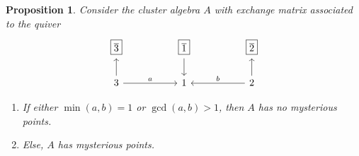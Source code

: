 \documentclass{amsart}
\numberwithin{equation}{section}
\newtheorem{proposition}[theorem]{Proposition}
\theoremstyle{definition}
\begin{document}
\begin{proposition}\label{prop:3-vertices}
Consider the cluster algebra $A$ with exchange matrix associated to the quiver
\[\begin{tikzcd}
	{\boxed{\overline{3}}} && {\boxed{\overline{1}}} && {\boxed{\overline{2}}} \\
	3 && 1 && 2
	\arrow[from=1-3, to=2-3]
	\arrow[from=2-1, to=1-1]
	\arrow["a", from=2-1, to=2-3]
	\arrow[from=2-5, to=1-5]
	\arrow["b"', from=2-5, to=2-3]
\end{tikzcd}\]
\begin{enumerate}
    \item If either $\min(a,b) = 1$ or $\gcd(a,b) > 1$, then $A$ has no mysterious points.
    \item Else, $A$ has mysterious points. 
\end{enumerate}
\end{proposition}
\end{document}
